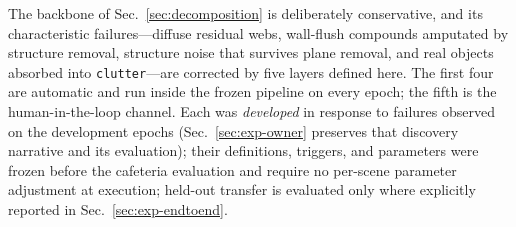 The backbone of Sec.~\ref{sec:decomposition} is deliberately conservative,
and its characteristic failures---diffuse residual webs, wall-flush
compounds amputated by structure removal, structure noise that survives
plane removal, and real objects absorbed into \texttt{clutter}---are
corrected by five layers defined here. The first four are automatic and
run inside the frozen pipeline on every epoch; the fifth is the
human-in-the-loop channel. Each was \emph{developed} in response to
failures observed on the development epochs
(Sec.~\ref{sec:exp-owner} preserves that discovery narrative and its
evaluation); their definitions, triggers, and parameters were frozen
before the cafeteria evaluation and require no per-scene parameter
adjustment at execution; held-out transfer is evaluated only where
explicitly reported in Sec.~\ref{sec:exp-endtoend}.

